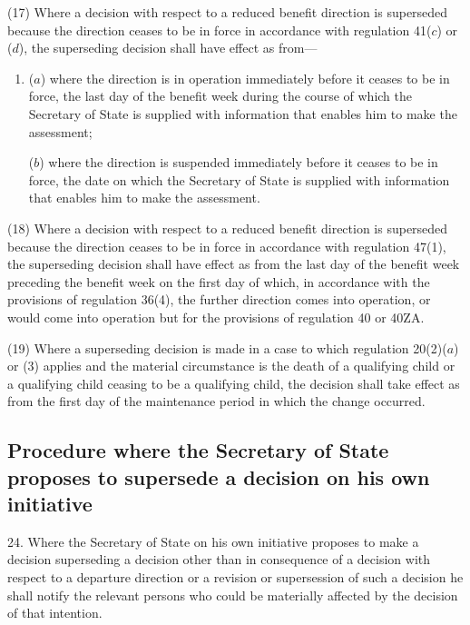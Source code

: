 \documentclass[a4paper,12pt]{article}
\begin{document}
(17) Where a decision with respect to a reduced benefit direction is superseded because the direction ceases to be in force in accordance with regulation 41($c$) or ($d$), the superseding decision shall have effect as from---
\begin{enumerate}\item[]
($a$) where the direction is in operation immediately before it ceases to be in force, the last day of the benefit week during the course of which the Secretary of State is supplied with information that enables him to make the assessment;

($b$) where the direction is suspended immediately before it ceases to be in force, the date on which the Secretary of State is supplied with information that enables him to make the assessment.
\end{enumerate}

(18) Where a decision with respect to a reduced benefit direction is superseded because the direction ceases to be in force in accordance with regulation 47(1), the superseding decision shall have effect as from the last day of the benefit week preceding the benefit week on the first day of which, in accordance with the provisions of regulation 36(4), the further direction comes into operation, or would come into operation but for the provisions of regulation 40 or 40ZA.

(19) Where a superseding decision is made in a case to which regulation 20(2)($a$)  or (3) applies and the material circumstance is the death of a qualifying child or a qualifying child ceasing to be a qualifying child, the decision shall take effect as from the first day of the maintenance period in which the change occurred.


\subsection[24. Procedure where the Secretary of State proposes to supersede a decision on his own initiative]{Procedure where the Secretary of State proposes to supersede a decision on his own initiative}

24.  Where the Secretary of State on his own initiative proposes to make a decision superseding a decision other than in consequence of a decision with respect to a departure direction or a revision or supersession of such a decision he shall notify the relevant persons who could be materially affected by the decision of that intention.
\end{document}
